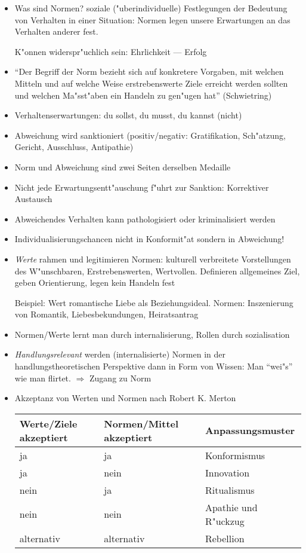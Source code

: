 \begin{itemize}
	\item
		Was sind Normen? soziale ("uberindividuelle) Festlegungen der Bedeutung von Verhalten in einer Situation: Normen legen unsere Erwartungen an das Verhalten anderer fest.

		K"onnen widerspr"uchlich sein: Ehrlichkeit --- Erfolg
	\item
		\enquote{Der Begriff der Norm bezieht sich auf konkretere Vorgaben, mit welchen Mitteln und auf welche Weise erstrebenswerte Ziele erreicht werden sollten und welchen Ma"sst"aben ein Handeln zu gen"ugen hat} (Schwietring)
	\item
		Verhaltenserwartungen: du sollst, du musst, du kannst (nicht)
	\item
		Abweichung wird sanktioniert (positiv/negativ: Gratifikation, Sch"atzung, Gericht, Ausschluss, Antipathie)
	\item
		Norm und Abweichung sind zwei Seiten derselben Medaille
	\item
		Nicht jede Erwartungsentt"auschung f"uhrt zur Sanktion: Korrektiver Austausch
	\item
		Abweichendes Verhalten kann pathologisiert oder kriminalisiert werden

	\item
		Individualisierungschancen nicht in Konformit"at sondern in Abweichung!
	\item
		\textit{Werte} rahmen und legitimieren Normen: kulturell verbreitete Vorstellungen des W"unschbaren, Erstrebenswerten, Wertvollen. Definieren allgemeines Ziel, geben Orientierung, legen kein Handeln fest

		Beispiel: Wert romantische Liebe als Beziehungsideal. Normen: Inszenierung von Romantik, Liebesbekundungen, Heiratsantrag
	\item
		Normen/Werte lernt man durch internalisierung, Rollen durch sozialisation
	\item
		\textit{Handlungsrelevant} werden (internalisierte) Normen in der handlungstheoretischen Perspektive dann in Form von Wissen: Man \enquote{wei"s} wie man flirtet. $\Rightarrow$ Zugang zu Norm

	\item
		Akzeptanz von Werten und Normen nach Robert K. Merton

		\begin{tabular}[H]{lll}
			Werte/Ziele akzeptiert & Normen/Mittel akzeptiert & Anpassungsmuster\\ \hline
			ja & ja & Konformismus \\ \hline
			ja & nein & Innovation \\ \hline
			nein & ja & Ritualismus \\ \hline
			nein & nein & Apathie und R"uckzug \\ \hline
			alternativ & alternativ & Rebellion \\ \hline
		\end{tabular}
\end{itemize}

